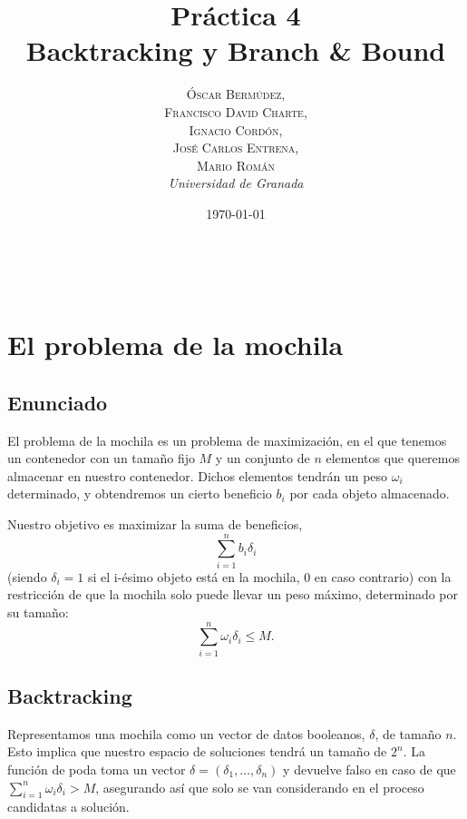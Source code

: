 \documentclass[a4paper, 11pt]{article} %
\title{\textbf{Práctica 4}\\ %
Backtracking y Branch \& Bound} %
\author{\textsc{Óscar Bermúdez,\\Francisco David Charte,\\Ignacio Cordón,\\José Carlos Entrena,\\Mario Román} %
\\{\textit{Universidad de Granada}}} %
\date{\today} %
\makeatletter
\renewcommand{\maketitle}{ %
\begin{flushright} %
    {\LARGE\@title} %
    
    \vspace{50pt} %
    
    {\large\@author} %
    \\\@date %
    
    \vspace{40pt} %
\end{flushright}
}
\makeatother
\begin{document}
    
    \maketitle %
    
    \renewcommand{\abstractname}{Resumen} %
    \begin{abstract}
    \end{abstract}
    {\parskip=2pt
    \tableofcontents
    }
    \pagebreak
    
    
    \section{El problema de la mochila}
      \subsection{Enunciado}
	El problema de la mochila es un problema de maximización, en el que tenemos un contenedor con un tamaño 
	fijo $M$ y un conjunto de $n$ elementos que queremos almacenar en nuestro contenedor. Dichos elementos tendrán un peso $\omega_i$
	determinado, y obtendremos un cierto beneficio $b_i$ por cada objeto almacenado.
	
	Nuestro objetivo es maximizar la suma de beneficios,
	\begin{equation}
	 \sum_{i=1}^{n} b_i\delta_i
	\end{equation}
	(siendo $\delta_i = 1$ si el i-ésimo objeto está en la mochila, 0 en caso contrario) con la restricción de que la mochila solo puede llevar un peso máximo, determinado por 
	su tamaño:
	\begin{equation}
	  \sum_{i=1}^{n} \omega_i\delta_i \leq M.
	\end{equation}

    
      \subsection{Backtracking}
	Representamos una mochila como un vector de datos booleanos, $\delta$, de tamaño $n$. Esto implica 
	que nuestro espacio de soluciones tendrá un tamaño de $2^n$. La función de poda toma un vector 
	$\delta = (\delta_1, \dots, \delta_n)$ y devuelve falso en caso de que $\sum_{i=1}^{n} \omega_i\delta_i > M$, 
	asegurando así que solo se van considerando en el proceso candidatas a solución.
    
	\newpage
    
\end{document}
